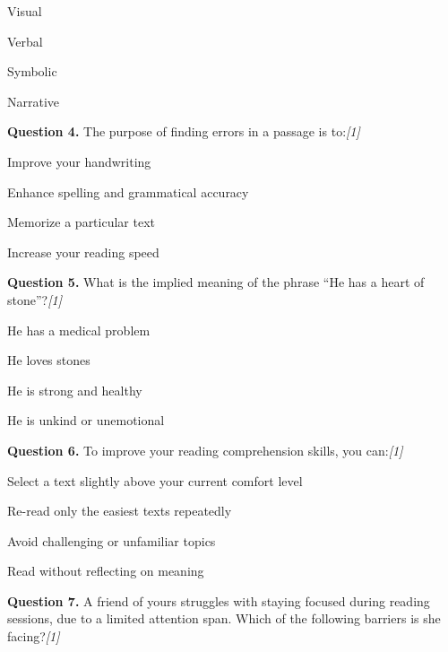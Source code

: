 \documentclass[11pt,a4paper]{article}
\newcommand{\pts}[1]{\hfill \textit{[#1]}}
\begin{document}
\begin{parts}
  \item Visual
  \item Verbal
  \item Symbolic
  \item Narrative
\end{parts}

\medskip




\noindent \textbf{Question 4.} The purpose of finding errors in a passage is to:\pts{1}

\begin{parts}
  \item Improve your handwriting
  \item Enhance spelling and grammatical accuracy
  \item Memorize a particular text
  \item Increase your reading speed
\end{parts}

\medskip




\noindent \textbf{Question 5.} What is the implied meaning of the phrase ``He has a heart of stone''?\pts{1}

\begin{parts}
  \item He has a medical problem
  \item He loves stones
  \item He is strong and healthy
  \item He is unkind or unemotional
\end{parts}

\medskip




\noindent \textbf{Question 6.} To improve your reading comprehension skills, you can:\pts{1}

\begin{parts}
  \item Select a text slightly above your current comfort level
  \item Re-read only the easiest texts repeatedly
  \item Avoid challenging or unfamiliar topics
  \item Read without reflecting on meaning
\end{parts}

\medskip




\noindent \textbf{Question 7.} A friend of yours struggles with staying focused during reading sessions, due to a limited attention span. Which of the following barriers is she facing?\pts{1}
\end{document}
